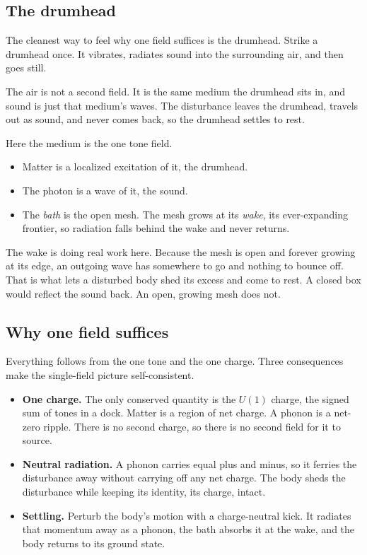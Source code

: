 \subsection{The drumhead}

The cleanest way to feel why one field suffices is the drumhead. Strike a drumhead once. It vibrates, radiates sound into the surrounding air, and then goes still.

The air is not a second field. It is the same medium the drumhead sits in, and sound is just that medium's waves. The disturbance leaves the drumhead, travels out as sound, and never comes back, so the drumhead settles to rest.

Here the medium is the one tone field.

\begin{itemize}
\item Matter is a localized excitation of it, the drumhead.
\item The photon is a wave of it, the sound.
\item The \emph{bath} is the open mesh. The mesh grows at its \emph{wake}, its ever-expanding frontier, so radiation falls behind the wake and never returns.
\end{itemize}

The wake is doing real work here. Because the mesh is open and forever growing at its edge, an outgoing wave has somewhere to go and nothing to bounce off. That is what lets a disturbed body shed its excess and come to rest. A closed box would reflect the sound back. An open, growing mesh does not.

\subsection{Why one field suffices}

Everything follows from the one tone and the one charge. Three consequences make the single-field picture self-consistent.

\begin{itemize}
\item \textbf{One charge.} The only conserved quantity is the $U(1)$ charge, the signed sum of tones in a dock. Matter is a region of net charge. A phonon is a net-zero ripple. There is no second charge, so there is no second field for it to source.
\item \textbf{Neutral radiation.} A phonon carries equal plus and minus, so it ferries the disturbance away without carrying off any net charge. The body sheds the disturbance while keeping its identity, its charge, intact.
\item \textbf{Settling.} Perturb the body's motion with a charge-neutral kick. It radiates that momentum away as a phonon, the bath absorbs it at the wake, and the body returns to its ground state.
\end{itemize}


